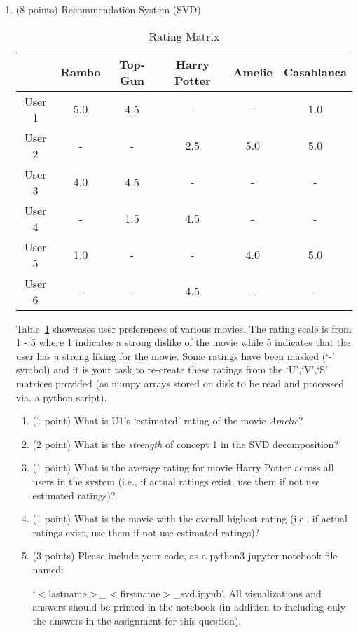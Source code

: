 \documentclass{article}%
\begin{document}
\begin{enumerate}
    
    \item (8 points) Recommendation System (SVD)
    
    \begin{table}[!ht]
        \centering
        \begin{tabular}{|c|c|c|c|c|c|}
             \toprule
              & Rambo & Top-Gun & Harry Potter& Amelie & Casablanca \\\hline
             User 1&5.0&4.5&-&-&1.0\\\hline
             User 2&-&-&2.5&5.0&5.0\\\hline
             User 3&4.0&4.5&-&-&-\\\hline
             User 4&-&1.5&4.5&-&-\\\hline
             User 5&1.0&-&-&4.0&5.0\\\hline
             User 6&-&-&4.5&-&-\\ \hline
        \end{tabular}
        \caption{Rating Matrix}
        \label{tab:rating matrix}
    \end{table}
    
    Table~\ref{tab:rating matrix} showcases user preferences of various movies. The rating scale is from 1 - 5 where 1 indicates a strong dislike of the movie while 5 indicates that the user has a strong liking for the movie. Some ratings have been masked (`-' symbol) and it is your task to re-create these ratings from the `U',`V',`S' matrices provided (as numpy arrays stored on disk to be read and processed via. a python script).
    
    \begin{enumerate}
        \item (1 point) What is U1's `estimated' rating of the movie \emph{Amelie}?
        \item (2 point) What is the \emph{strength} of concept 1 in the SVD decomposition?
        \item (1 point) What is the average rating for movie Harry Potter across all users in the system (i.e., if actual ratings exist, use them if not use estimated ratings)?
        \item (1 point) What is the movie with the overall highest rating (i.e., if actual ratings exist, use them if not use estimated ratings)?
        \item (3 points) Please include your code, as a python3 jupyter notebook file named: 
        
        `$<$lastname$>$\_$<$firstname$>$\_svd.ipynb'. All visualizations and answers should be printed in the notebook (in addition to including only the answers in the assignment for this question).
    \end{enumerate}
    

\end{enumerate}
\end{document}
